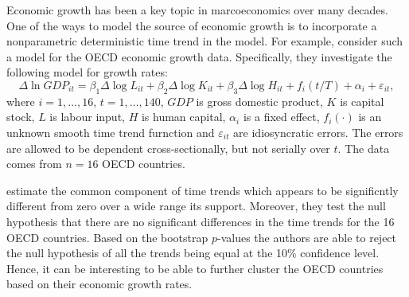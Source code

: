 \documentclass[a4paper,12pt]{article}
\begin{document}
\begin{example}
Economic growth has been a key topic in marcoeconomics over many decades. One of the ways to model the source of economic growth is to incorporate a nonparametric deterministic time trend in the model. For example,  \cite{Zhang2012} consider such a model for the OECD economic growth data. Specifically, they investigate the following model for growth rates:
\begin{equation}\label{model-zhang}
\Delta \ln GDP_{it} = \beta_1 \Delta \log L_{it} +\beta_2 \Delta \log K_{it} +\beta_3 \Delta \log H_{it} +f_i(t/T) +\alpha_i + \varepsilon_{it},
\end{equation}
where $i = 1,\ldots, 16$, $t = 1, \ldots, 140$, $GDP$ is gross domestic product, $K$ is capital stock, $L$ is labour input, $H$ is human capital, $\alpha_i$ is a fixed effect, $f_i(\cdot)$ is an unknown smooth time trend furnction and $\varepsilon_{it}$ are idiosyncratic errors. The errors are allowed to be dependent cross-sectionally, but not serially over $t$. The data comes from $n = 16$ OECD countries.

\cite{Zhang2012} estimate the common component of time trends which appears to be significntly different from zero over a wide range its support. Moreover, they test the null hypothesis that there are no significant differences in the time trends for the 16 OECD countries. Based on the bootstrap $p$-values the authors are able to reject the null hypothesis of all the trends being equal at the 10\% confidence level. Hence, it can be interesting to be able to further cluster the OECD countries based on their economic growth rates.
\end{example}
\end{document}
